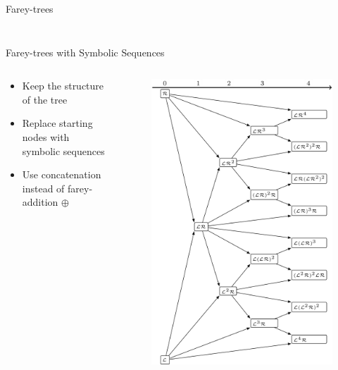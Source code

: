 \begin{frame}{Farey-trees}
\begin{columns}
\begin{column}{.25 \textwidth}
\begin{figure}
			\end{figure}
		\end{column}
	\end{columns}
\end{frame}

\begin{frame}{Farey-trees with Symbolic Sequences}
	\begin{columns}
		\begin{column}{.5 \textwidth}
			\begin{itemize}
				\item Keep the structure of the tree
				\item Replace starting nodes with symbolic sequences
				\item Use concatenation instead of farey-addition $\oplus$
			\end{itemize}
		\end{column}
		\begin{column}{.3 \textwidth}
			\vspace{-3em}
			\begin{figure}
				\includegraphics[width=\textwidth]{../../Report/Figures/FareyTrees/LR/adding.png}

\end{figure}
\end{column}
\end{columns}
\end{frame}
